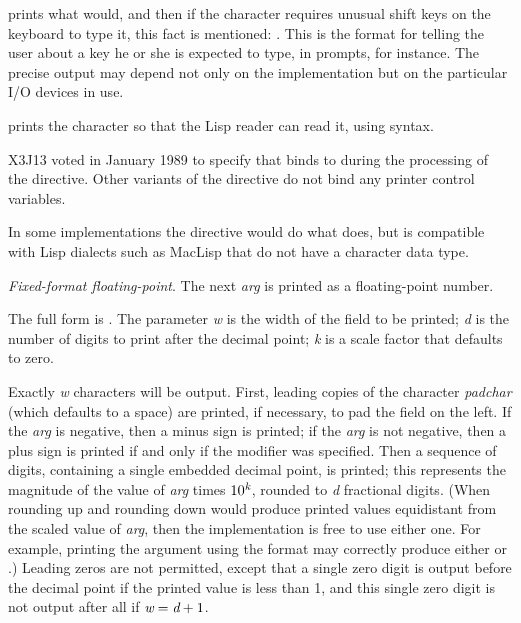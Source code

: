 \begin{flushdesc}
 prints what  would, and then
if the character requires unusual shift keys on the keyboard to type it,
this fact is mentioned: .  This is the
format for telling the user about a key he or she is expected to type,
in prompts, for instance.  The precise output may depend not only
on the implementation but on the particular I/O devices in use.

 prints the character so that the Lisp reader can read it,
using \cd{\#{\Xbackslash}} syntax.

\begin{new}
X3J13 voted in January 1989
to specify that  binds  to 
during the processing of the  directive.
Other variants of the  directive do not bind any printer control variables.
\end{new}

\beforenoterule
\begin{rationale}
In some implementations the  directive would
do what  does,
but  is compatible
with Lisp dialects such as MacLisp that do not have a character data type.
\end{rationale}
\afternoterule

\item[\cd{{\Xtilde}F}]
\emph{Fixed-format floating-point}.
The next \emph{arg} is printed as a floating-point
number.

The full form is .
The parameter \emph{w}
is the width of the field to be printed; \emph{d} is the number
of digits to print after the decimal point; \emph{k} is a scale factor
that defaults to zero.

Exactly \emph{w} characters will
be output.  First, leading copies of the character \emph{padchar}
(which defaults to a space) are printed, if necessary, to pad the
field on the left.
If the \emph{arg} is negative, then a minus sign is printed;
if the \emph{arg} is not negative, then a plus sign is printed
if and only if the \cd{{\Xatsign}} modifier was specified.  Then a sequence
of digits, containing a single embedded decimal point, is printed;
this represents the magnitude of the value of \emph{arg} times $10^{\hbox{\scriptsize\it k}}$,
rounded to \emph{d} fractional digits.
(When rounding up and rounding down would produce printed values
equidistant from the scaled value of \emph{arg}, then the implementation
is free to use either one.  For example, printing the argument
 using the format  may correctly produce
either  or .)
Leading zeros are not permitted, except that a single
zero digit is output before the decimal point if the printed value
is less than 1, and this single zero digit is not output
after all if $\emph{w}=\emph{d}+1$.


\end{flushdesc}
